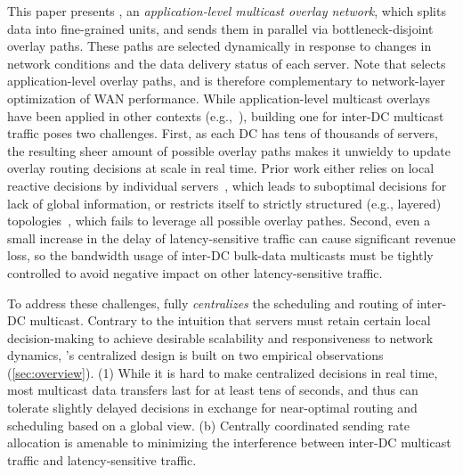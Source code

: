 This paper presents {\em \name}, an {\em application-level multicast
overlay network}, which splits data into fine-grained units, and
sends them in parallel via bottleneck-disjoint overlay paths. These
paths are selected dynamically in response to changes in network
conditions and the data delivery status of each server. Note that
\name selects application-level overlay paths, and is therefore
complementary to network-layer optimization of WAN performance.
While application-level multicast overlays have been applied in other
contexts (e.g.,~\cite{Liebeherr2002Application,Wang2007mTreebone,
Andreev2013Designing,Mokhtarian2015Minimum}), building one for
inter-DC multicast traffic poses two challenges. First, as each DC
has tens of thousands of servers, the resulting sheer amount of
possible overlay paths makes it unwieldy to update overlay routing
decisions at scale in real time. Prior work either relies on local
reactive decisions by individual servers~\cite{kostic2003bullet,
Repantis2010Scaling,Huang2014A}, which leads to suboptimal decisions
for lack of global information, or restricts itself to strictly
structured (e.g., layered) topologies~\cite{Nygren2010The}, which
fails to leverage all possible overlay pathes. Second, even a small
increase in the delay of latency-sensitive traffic can cause
significant revenue loss, so the bandwidth usage of inter-DC
bulk-data multicasts must be tightly controlled to avoid negative
impact on other latency-sensitive traffic.

To address these challenges, \name fully {\em centralizes} the
scheduling and routing of inter-DC multicast. Contrary to the
intuition that servers must retain certain local decision-making to
achieve desirable scalability and responsiveness to network dynamics,
\name's centralized design is built on two empirical observations
(\Section\ref{sec:overview}).
(1) While it is hard to make centralized decisions in real time, most
multicast data transfers last for at least tens of seconds, and thus
can tolerate slightly delayed decisions in exchange for near-optimal
routing and scheduling based on a global view.
(b) Centrally coordinated sending rate allocation is amenable to
minimizing the interference between inter-DC multicast traffic and
latency-sensitive traffic.

